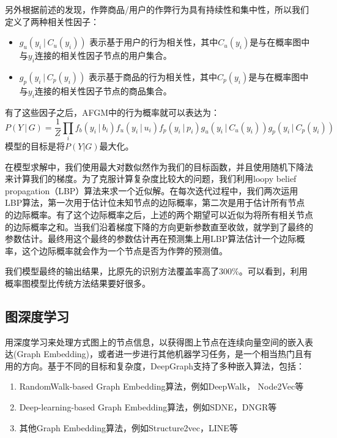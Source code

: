 另外根据前述的发现，作弊商品/用户的作弊行为具有持续性和集中性，所以我们定义了两种相关性因子：
\begin{itemize}
	\item $g_u (y_i│C_u (y_i))$ 表示基于用户的行为相关性，其中$C_u (y_i )$是与在概率图中与$y_i$连接的相关性因子节点的用户集合。
	\item $g_p (y_i│C_p (y_i))$ 表示基于商品的行为相关性，其中$C_p (y_i )$是与在概率图中与$y_i$连接的相关性因子节点的商品集合。
\end{itemize}

有了这些因子之后，AFGM中的行为概率就可以表达为：
\begin{equation*}
P(Y│G) =\frac{1}{Z}\prod_{i}f_b(y_i│b_i) f_u (y_i│u_i ) 
 f_p (y_i│p_i) g_u(y_i│C_u (y_i)) g_p (y_i│C_p (y_i))
\end{equation*}
模型的目标是将$P(Y|G)$最大化。

在模型求解中，我们使用最大对数似然作为我们的目标函数，并且使用随机下降法来计算我们的梯度。为了克服计算复杂度比较大的问题，我们利用loopy belief propagation（LBP）算法来求一个近似解。在每次迭代过程中，我们两次运用LBP算法，第一次用于估计位未知节点的边际概率，第二次是用于估计所有节点的边际概率。有了这个边际概率之后，上述的两个期望可以近似为将所有相关节点的边际概率之和。当我们沿着梯度下降的方向更新参数直至收敛，就学到了最终的参数估计。最终用这个最终的参数估计再在预测集上用LBP算法估计一个边际概率，这个边际概率就会作为一个节点是否为作弊的预测值。

我们模型最终的输出结果，比原先的识别方法覆盖率高了300\%。可以看到，利用概率图模型比传统方法结果要好很多。


\subsection{图深度学习}

用深度学习来处理方式图上的节点信息，以获得图上节点在连续向量空间的嵌入表达(Graph Embedding)，或者进一步进行其他机器学习任务，是一个相当热门且有用的方向。基于不同的目标和复杂度，DeepGraph支持了多种嵌入算法，包括：
\begin{enumerate}
	\item RandomWalk-based Graph Embedding算法，例如DeepWalk\cite{deepWalk}， Node2Vec\cite{node2vec}等
	\item Deep-learning-based Graph Embedding算法，例如SDNE\cite{SDNE}，DNGR\cite{DeepNN}等
	\item 其他Graph Embedding算法，例如Structure2vec\cite{str2vec}，LINE\cite{LINE}等
\end{enumerate}

